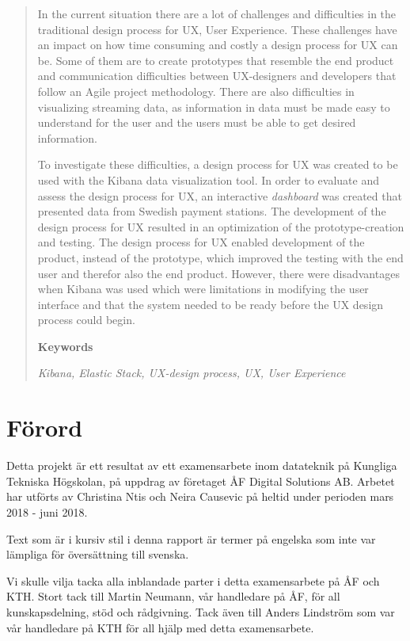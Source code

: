 \documentclass[12pt]{kththesis}
\begin{document}
\begin{abstract}

In the current situation there are a lot of challenges and difficulties in the traditional design process for UX, User Experience. These challenges have an impact on how time consuming and costly a design process for UX can be. Some of them are to create prototypes that resemble the end product and communication difficulties between UX-designers and developers that follow an Agile project methodology. There are also difficulties in visualizing streaming data, as information in data must be made easy to understand for the user and the users must be able to get desired information.
 
To investigate these difficulties, a design process for UX was created to be used with the Kibana data visualization tool. In order to evaluate and assess the design process for UX, an interactive \textit{dashboard} was created that presented data from Swedish payment stations. The development of the design process for UX resulted in an optimization of the prototype-creation and testing. The design process for UX enabled development of the product, instead of the prototype, which improved the testing with the end user and therefor also the end product. However, there were disadvantages when Kibana was used which were limitations in modifying the user interface and that the system needed to be ready before the UX design process could begin. 


\textbf{Keywords}

\textit{Kibana, Elastic Stack, UX-design process, UX, User Experience}

\end{abstract}

\chapter*{Förord}
Detta projekt är ett resultat av ett examensarbete inom datateknik på Kungliga Tekniska Högskolan, på uppdrag av företaget ÅF Digital Solutions AB. Arbetet har utförts av Christina Ntis och Neira Causevic på heltid under perioden mars 2018 - juni 2018.

Text som är i kursiv stil i denna rapport är termer på engelska som inte var lämpliga för översättning till svenska.

Vi skulle vilja tacka alla inblandade parter i detta examensarbete på ÅF och KTH. Stort tack till Martin Neumann, vår handledare på ÅF, för all kunskapsdelning, stöd och rådgivning. Tack även till Anders Lindström som var vår handledare på KTH för all hjälp med detta examensarbete. 
\end{document}
